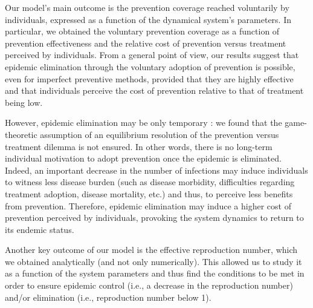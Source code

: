 Our model's main outcome is the prevention coverage reached voluntarily by individuals, expressed as a function of the dynamical system's parameters. In particular, we obtained the voluntary prevention coverage as a function of prevention effectiveness and the relative cost of prevention versus treatment perceived by individuals. From a general point of view, our results suggest that epidemic elimination through the voluntary adoption of prevention is possible, even for imperfect preventive methods, provided that they are highly effective and that individuals perceive the cost of prevention relative to that of treatment being low. 

However, epidemic elimination may be only temporary : we found that the game-theoretic assumption of an equilibrium resolution of the prevention versus treatment dilemma is not ensured. In other words, there is no long-term individual motivation to adopt prevention once the epidemic is eliminated. Indeed, an important decrease in the number of infections may induce individuals to witness less disease burden (such as disease morbidity, difficulties regarding treatment adoption, disease mortality, etc.) and thus, to perceive less benefits from prevention. Therefore, epidemic elimination may induce a higher cost of prevention perceived by individuals, provoking the system dynamics to return to its endemic status.

%

Another key outcome of our model is the effective reproduction number, which we obtained analytically (and not only numerically). This allowed us to study it as a function of the system parameters and thus find the conditions to be met in order to ensure epidemic control (i.e., a decrease in the reproduction number) and/or elimination (i.e., reproduction number below 1). 

